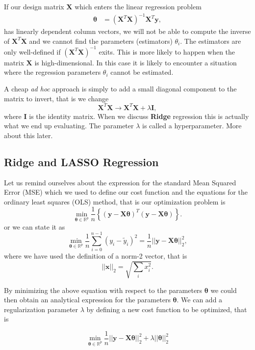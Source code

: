 \documentclass[%
oneside,                 %
final,                   %
10pt]{article}
\begin{document}
If our design matrix $\bm{X}$ which enters the linear regression problem
\begin{align}
\bm{\theta} & =  (\bm{X}^{T} \bm{X})^{-1} \bm{X}^{T} \bm{y},
\end{align}
has linearly dependent column vectors, we will not be able to compute the inverse
of $\bm{X}^T\bm{X}$ and we cannot find the parameters (estimators) $\theta_i$. 
The estimators are only well-defined if $(\bm{X}^{T}\bm{X})^{-1}$ exits. 
This is more likely to happen when the matrix $\bm{X}$ is high-dimensional. In this case it is likely to encounter a situation where 
the regression parameters $\theta_i$ cannot be estimated.

A cheap  \emph{ad hoc} approach is  simply to add a small diagonal component to the matrix to invert, that is we change
\[
\bm{X}^{T} \bm{X} \rightarrow \bm{X}^{T} \bm{X}+\lambda \bm{I},
\]
where $\bm{I}$ is the identity matrix.  When we discuss \textbf{Ridge} regression this is actually what we end up evaluating. The parameter $\lambda$ is called a hyperparameter. More about this later. 

\subsection{Ridge and LASSO Regression}

Let us remind ourselves about the expression for the standard Mean Squared Error (MSE) which we used to define our cost function and the equations for the ordinary least squares (OLS) method, that is 
our optimization problem is
\[
{\displaystyle \min_{\bm{\theta}\in {\mathbb{R}}^{p}}}\frac{1}{n}\left\{\left(\bm{y}-\bm{X}\bm{\theta}\right)^T\left(\bm{y}-\bm{X}\bm{\theta}\right)\right\}.
\]
or we can state it as
\[
{\displaystyle \min_{\bm{\theta}\in
{\mathbb{R}}^{p}}}\frac{1}{n}\sum_{i=0}^{n-1}\left(y_i-\tilde{y}_i\right)^2=\frac{1}{n}\vert\vert \bm{y}-\bm{X}\bm{\theta}\vert\vert_2^2,
\]
where we have used the definition of  a norm-2 vector, that is
\[
\vert\vert \bm{x}\vert\vert_2 = \sqrt{\sum_i x_i^2}. 
\]

By minimizing the above equation with respect to the parameters
$\bm{\theta}$ we could then obtain an analytical expression for the
parameters $\bm{\theta}$.  We can add a regularization parameter $\lambda$ by
defining a new cost function to be optimized, that is

\[
{\displaystyle \min_{\bm{\theta}\in
{\mathbb{R}}^{p}}}\frac{1}{n}\vert\vert \bm{y}-\bm{X}\bm{\theta}\vert\vert_2^2+\lambda\vert\vert \bm{\theta}\vert\vert_2^2
\]
\end{document}
